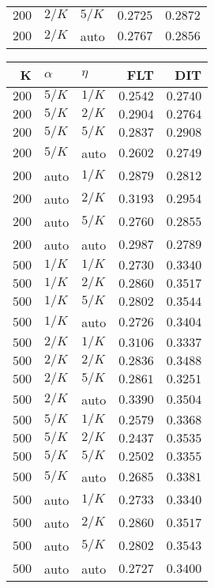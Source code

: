 \begin{table}
\begin{spacing}{1.2}
{\begin{tabular}{rll|rr}
$200$ &  $2/K$ &  $5/K$ &         $0.2725$ & $0.2872$ \\
$200$ &  $2/K$ &   auto &         $0.2767$ & $0.2856$ \\
\bottomrule
\end{tabular}
} \hfill \parbox{.45\linewidth}{\centering \begin{tabular}{rll|rr}
\toprule
    K &  $\alpha$ &    $\eta$ & FLT &        DIT \\
\midrule
$200$ &  $5/K$ &  $1/K$ &         $0.2542$ &      $0.2740$ \\
$200$ &  $5/K$ &  $2/K$ &         $0.2904$ &      $0.2764$ \\
$200$ &  $5/K$ &  $5/K$ &         $0.2837$ &      $0.2908$ \\
$200$ &  $5/K$ &   auto &         $0.2602$ &      $0.2749$ \\
$200$ &   auto &  $1/K$ &         $0.2879$ &      $0.2812$ \\
$200$ &   auto &  $2/K$ &         $0.3193$ &      $0.2954$ \\
$200$ &   auto &  $5/K$ &         $0.2760$ &      $0.2855$ \\
$200$ &   auto &   auto &         $0.2987$ &      $0.2789$ \\
\myrowcolor $500$ &  $1/K$ &  $1/K$ &         $0.2730$ &      $0.3340$ \\
$500$ &  $1/K$ &  $2/K$ &         $0.2860$ &      $0.3517$ \\
$500$ &  $1/K$ &  $5/K$ &         $0.2802$ & $\bm{0.3544}$ \\
$500$ &  $1/K$ &   auto &         $0.2726$ &      $0.3404$ \\
$500$ &  $2/K$ &  $1/K$ &         $0.3106$ &      $0.3337$ \\
$500$ &  $2/K$ &  $2/K$ &         $0.2836$ &      $0.3488$ \\
$500$ &  $2/K$ &  $5/K$ &         $0.2861$ &      $0.3251$ \\
$500$ &  $2/K$ &   auto &    $\bm{0.3390}$ &      $0.3504$ \\
$500$ &  $5/K$ &  $1/K$ &         $0.2579$ &      $0.3368$ \\
$500$ &  $5/K$ &  $2/K$ &         $0.2437$ &      $0.3535$ \\
$500$ &  $5/K$ &  $5/K$ &         $0.2502$ &      $0.3355$ \\
$500$ &  $5/K$ &   auto &         $0.2685$ &      $0.3381$ \\
$500$ &   auto &  $1/K$ &         $0.2733$ &      $0.3340$ \\
$500$ &   auto &  $2/K$ &         $0.2860$ &      $0.3517$ \\
$500$ &   auto &  $5/K$ &         $0.2802$ &      $0.3543$ \\
$500$ &   auto &   auto &         $0.2727$ &      $0.3400$ \\
\bottomrule
\end{tabular}
}
\end{spacing}
\end{table}
